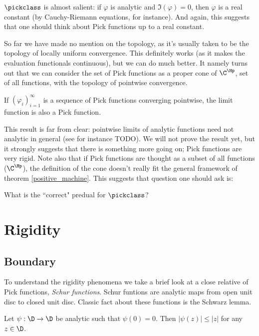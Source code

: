 $\pickclass$ is almost salient: if $\varphi$ is analytic and $\Im(\varphi) = 0$, then $\varphi$ is a real constant (by Cauchy-Riemann equations, for instance). And again, this suggests that one should think about Pick functions up to a real constant.

So far we have made no mention on the topology, as it's usually taken to be the topology of locally uniform convergence. This definitely works (as it makes the evaluation functionals continuous), but we can do much better. It namely turns out that we can consider the set of Pick functions as a proper cone of $\C^{\Hp}$, set of all functions, with the topology of pointwise convergence.

\begin{prop}\label{pick_convergence}
	If $(\varphi_{i})_{i = 1}^{\infty}$ is a sequence of Pick functions converging pointwise, the limit function is also a Pick function.
\end{prop}

This result is far from clear: pointwise limits of analytic functions need not analytic in general (see for instance TODO). We will not prove the result yet, but it strongly suggests that there is something more going on; Pick functions are very rigid. Note also that if Pick functions are thought as a subset of all functions ($\C^{\Hp}$), the definition of the cone doesn't really fit the general framework of theorem \ref{positive_machine}. This suggests that question one should ask is:

\begin{quest}\label{pick_predual}
	What is the ``correct" predual for $\pickclass$?
\end{quest}


\section{Rigidity}

\subsection{Boundary}

To understand the rigidity phenomena we take a brief look at a close relative of Pick functions, \textit{Schur functions}. Schur funtions are analytic maps from open unit disc to closed unit disc. Classic fact about these functions is the Schwarz lemma.

\begin{lause}
	Let $\psi : \D \to \D$ be analytic such that $\psi(0) = 0$. Then $|\psi(z)| \leq |z|$ for any $z \in \D$.
\end{lause}

